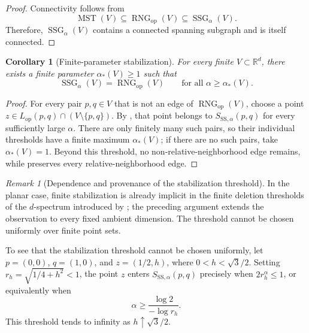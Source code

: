 \documentclass[a4paper,fleqn]{cas-dc}
\newtheorem{corollary}{Corollary}
\theoremstyle{definition}
\theoremstyle{remark}
\newtheorem{remark}{Remark}
\newcommand{\R}{\mathds{R}}
\newcommand{\0}{\mathbf{0}}
\DeclareMathOperator{\SSG}{SSG}
\DeclareMathOperator{\RNG}{RNG}
\DeclareMathOperator{\MST}{MST}
\begin{document}
\begin{proof}
Connectivity follows from
\begin{equation}
\MST(V)\subseteq\RNG_{\mathrm{op}}(V)
\subseteq\SSG_\alpha(V).
\end{equation}
Therefore, \(\SSG_\alpha(V)\) contains a connected spanning subgraph and
is itself connected.
\end{proof}

\begin{corollary}[Finite-parameter stabilization]
\label{cor:finite-stabilization}
For every finite $V\subset\R^d$, there exists a finite parameter
$\alpha_\ast(V)\geq1$ such that
\begin{equation}
    \SSG_\alpha(V)=\RNG_{\mathrm{op}}(V)
    \qquad\text{for all }\alpha\geq\alpha_\ast(V).
\end{equation}
\end{corollary}

\begin{proof}
For every pair $p,q\in V$ that is not an edge of
$\RNG_{\mathrm{op}}(V)$, choose a point
$z\in L_{\mathrm{op}}(p,q)\cap(V\setminus\{p,q\})$.
By , that point belongs to
$S_{\mathrm{SS},\alpha}(p,q)$ for every sufficiently large $\alpha$.
There are only finitely many such pairs, so their individual thresholds
have a finite maximum $\alpha_\ast(V)$; if there are no such pairs, take
$\alpha_\ast(V)=1$. Beyond this threshold, no non-relative-neighborhood
edge remains, while  preserves every
relative-neighborhood edge.
\end{proof}

\begin{remark}[Dependence and provenance of the stabilization threshold]
\label{rem:stabilization-threshold}
In the planar case, finite stabilization is already implicit in the
finite deletion thresholds of the \(d\)-spectrum introduced by
\citet[Def.~3.12]{kannangara2018stepping}; the preceding argument extends
the observation to every fixed ambient dimension. The threshold cannot be
chosen uniformly over finite point sets. 

To see that the stabilization threshold cannot be chosen uniformly, let
$p=(0,0)$, $q=(1,0)$, and $z=(1/2,h)$, where
$0<h<\sqrt{3}/2$. Setting $r_h=\sqrt{1/4+h^2}<1$, the point $z$ enters
$S_{\mathrm{SS},\alpha}(p,q)$ precisely when
$2r_h^\alpha\leq1$, or equivalently when
\begin{equation}
\alpha\geq\frac{\log 2}{-\log r_h}.
\end{equation}
This threshold tends to infinity as $h\uparrow\sqrt{3}/2$.
\end{remark}
\end{document}
